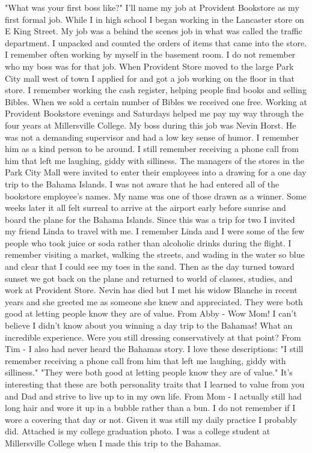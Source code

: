 "What was your first boss like?"
I'll name my job at Provident Bookstore as my first formal job. While I in high school I began working in the Lancaster store on E King Street. My job was a behind the scenes job in what was called the traffic department. I unpacked and counted the orders of items that came into the store. I remember often working by myself in the basement room. I do not remember who my boss was for that job.
When Provident Store moved to the large Park City mall west of town I applied for and got a job working on the floor in that store. I remember working the cash register, helping people find books and selling Bibles. When we sold a certain number of Bibles we received one free. Working at Provident Bookstore evenings and Saturdays helped me pay my way through the four years at Millersville College. My boss during this job was Nevin Horst. He was not a demanding supervisor and had a low key sense of humor. I remember him as a kind person to be around. I still remember receiving a phone call from him that left me laughing, giddy with silliness. The managers of the stores in the Park City Mall were invited to enter their employees into a drawing for a one day trip to the Bahama Islands. I was not aware that he had entered all of the bookstore employee's names. My name was one of those drawn as a winner. 
Some weeks later it all felt surreal to arrive at the airport early before sunrise and board the plane for the Bahama Islands. Since this was a trip for two I invited my friend Linda to travel with me. I remember Linda and I were some of the few people who took juice or soda rather than alcoholic drinks during the flight. I remember visiting a market, walking the streets, and wading in the water so blue and clear that I could see my toes in the sand. Then as the day turned toward sunset we got back on the plane and returned to world of classes, studies, and work at Provident Store.
Nevin has died but I met his widow Blanche in recent years and she greeted me as someone she knew and appreciated. They were both good at letting people know they are of value. 
From Abby - Wow Mom! I can't believe I didn't know about you winning a day trip to the Bahamas! What an incredible experience. Were you still dressing conservatively at that point?
From Tim - I also had never heard the Bahamas story. I love these descriptions:
"I still remember receiving a phone call from him that left me laughing, giddy with silliness."
"They were both good at letting people know they are of value."
It's interesting that these are both personality traits that I learned to value from you and Dad and strive to live up to in my own life.
From Mom - I actually still had long hair and wore it up in a bubble rather than a bun. I do not remember if I wore a covering that day or not. Given it was still my daily practice I probably did. Attached is my college graduation photo. I was a college student at Millersville College when I made this trip to the Bahamas.





